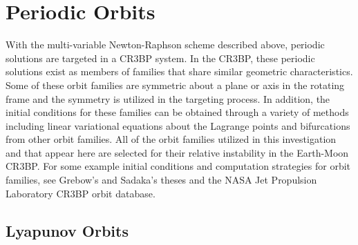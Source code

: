 \section{Periodic Orbits}
With the multi-variable Newton-Raphson scheme described above, periodic solutions are targeted in a
CR3BP system. In the CR3BP, these periodic solutions exist as members of families that share
similar geometric characteristics. Some of these orbit families are symmetric about a plane or axis
in the rotating frame and the symmetry is utilized in the targeting process. In addition, the
initial conditions for these families can be obtained through a variety of methods including linear
variational equations about the Lagrange points and bifurcations from other orbit families. All of
the orbit families utilized in this investigation and that appear here are selected for their
relative instability in the Earth-Moon CR3BP. For some example initial conditions and computation
strategies for orbit families, see Grebow's\cite{Grebow:2006} and Sadaka's\cite{Sadaka:2023} theses
and the NASA Jet Propulsion Laboratory CR3BP orbit database\cite{Park}.

\subsection{Lyapunov Orbits}
